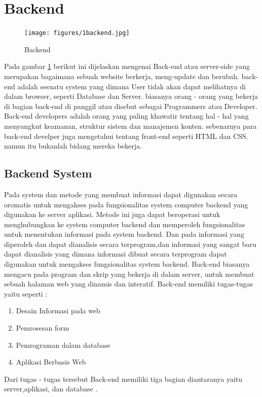 \section{Backend}

\begin{figure}[ht]
\centerline{\texttt{[image: figures/1backend.jpg]}}
\caption{Backend}
\label{1backend}
\end{figure}

	Pada gambar \ref{1backend} berikut ini dijelaskan mengenai Back-end atau server-side yang merupakan bagaimana sebuah website berkerja, meng-update
dan berubah. back-end adalah sesuatu system yang dimana User tidak akan dapat melihatnya di dalam browser,
seperti Database dan Server. biasanya orang - orang yang bekerja di bagian back-end di panggil atau disebut sebagai
Programmers atau Developer. Back-end developers adalah orang yang paling khawatir tentang hal - hal yang menyangkut keamanan,
struktur sistem dan manajemen konten. sebenarnya para back-end develper juga mengetahui tentang front-end seperti HTML dan CSS.
namun itu bukanlah bidang mereka bekerja. 

\subsection{Backend System}
	Pada system dan metode  yang membuat informasi dapat digunakan secara oromatis untuk mengakses 
pada fungsionalitas system computer backend yang digunakan ke server aplikasi. 
Metode ini juga dapat beroperasi untuk menghubungkan ke system computer backend dan memperoleh 
fungsionalitas untuk menentukan informasi  pada system backend. Dan pada informasi yang diperoleh 
dan dapat dianalisis secara terprogram,dan informasi yang sangat baru dapat dianalisis yang dimana 
informasi dibuat secara terprogram dapat digunakan untuk mengakses fungsionalitas system backend.
Back-end biasanya mengacu pada program dan skrip yang bekerja di dalam server, untuk membuat sebuah 
halaman web yang dinamis dan interatif. Back-end memiliki tugas-tugas yaitu seperti :

\begin{enumerate}
\item Desain Informasi pada web
\item Pemrosesan form
\item Pemrograman dalam database
\item Aplikasi Berbasis Web
\end{enumerate}
Dari tugas - tugas tersebut Back-end memiliki tiga bagian diantaranya yaitu server,aplikasi, dan database
\cite{shapiro2005system}.

